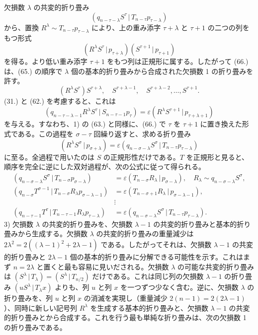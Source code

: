 \documentclass[11pt]{jlreq}
\newcommand{\pair}[2]{(#1\,|\,#2)}
\newcommand{\eps}{\varepsilon}
\begin{document}
欠損数 $\lambda$ の共変的折り畳み
\[
 \pair{q_{n-\tau-\lambda}S^\tau}{T_{n-\tau}p_{\tau-\lambda}}
\]
から、置換 $R^\lambda\sim T_{n-\tau}p_{\tau-\lambda}$ により、上の重み添字 $\tau+\lambda$ と $\tau+1$ の二つの列をもつ形式
\begin{equation}
 \pair{R^\lambda S^\tau}{p_{\tau+\lambda}}\pair{S^{\tau+1}}{p_{\tau+1}}
\tag{66}
\end{equation}
を得る。より低い重み添字 $\tau+1$ をもつ列は正規形に属する。したがって (66.) は、(65.) の順序で $\lambda$ 個の基本的折り畳みから合成された欠損数 1 の折り畳みを許す。
\[
 (R^\lambda S^\tau)S^{\tau+\lambda},\quad S^{\tau+\lambda-1},\quad S^{\tau+\lambda-2},\ldots,S^{\tau+1}.
\]
(31.) と (62.) を考慮すると、これは
\[
 \pair{q_{n-\tau-\lambda-1}R^\lambda S^\tau}{S_{n-\tau-1}p_\tau}=\eps\pair{R^\lambda S^{\tau+1}}{p_{\tau+\lambda+1}}
\]
を与える。すなわち、1) の (63.) と同様に、(66.) で $\tau$ を $\tau+1$ に置き換えた形式である。この過程を $\sigma-\tau$ 回繰り返すと、求める折り畳み
\[
 \pair{R^\lambda S^\sigma}{p_{\sigma+\lambda}}=\eps\pair{q_{n-\sigma-\lambda}S^\sigma}{T_{n-\tau}p_{\tau-\lambda}}
\]
に至る。全過程で用いたのは $S$ の正規形性だけである。$T$ を正規形と見ると、順序を完全に逆にした双対過程が、次の公式に従って得られる。
\begin{align*}
\pair{q_{n-\sigma-\lambda}S^\sigma}{T_{n-\sigma}p_{\sigma-\lambda}}&=\eps\pair{T_{n-\sigma}R_\lambda}{p_{\sigma-\lambda}},\quad R_\lambda\sim q_{n-\sigma-\lambda}S^\sigma,\\
\pair{q_{n-\sigma}T^{\sigma-1}}{T_{n-\sigma}R_\lambda p_{\sigma-\lambda-1}}&=\eps\pair{T_{n-\sigma+1}R_\lambda}{p_{\sigma-\lambda-1}},\\
&\vdots\\
\pair{q_{n-\tau-1}T^\tau}{T_{n-\tau-1}R_\lambda p_{\tau-\lambda}}&=\eps\pair{q_{n-\sigma-\lambda}S^\sigma}{T_{n-\tau}p_{\tau-\lambda}}.
\end{align*}
3) 欠損数 $\lambda$ の共変的折り畳みを、欠損数 $\lambda-1$ の共変的折り畳みと基本的折り畳みから生成する。欠損数 $\lambda$ の共変的折り畳みの重量減少は $2\lambda^2=2((\lambda-1)^2+2\lambda-1)$ である。したがってそれは、欠損数 $\lambda-1$ の共変的折り畳みと $2\lambda-1$ 個の基本的折り畳みに分解できる可能性を示す。これはまず $n=2\lambda$ と置くと最も容易に見いだされる。欠損数 $\lambda$ の可能な共変的折り畳みは $\pair{S^\lambda}{T_\lambda}=\pair{S^\lambda}{T_{n/2}}$ だけである。これは同じ列の欠損数 $\lambda-1$ の折り畳み $\pair{uS^\lambda}{T_\lambda x}$ よりも、列 $u$ と列 $x$ を一つずつ少なく含む。逆に、欠損数 $\lambda$ の折り畳みを、列 $u$ と列 $x$ の消滅を実現し（重量減少 $2(n-1)=2(2\lambda-1)$）、同時に新しい記号列 $R^\lambda$ を生成する基本的折り畳みと、欠損数 $\lambda-1$ の共変的折り畳みとから合成する。これを行う最も単純な折り畳みは、次の欠損数 1 の折り畳みである。
\end{document}
